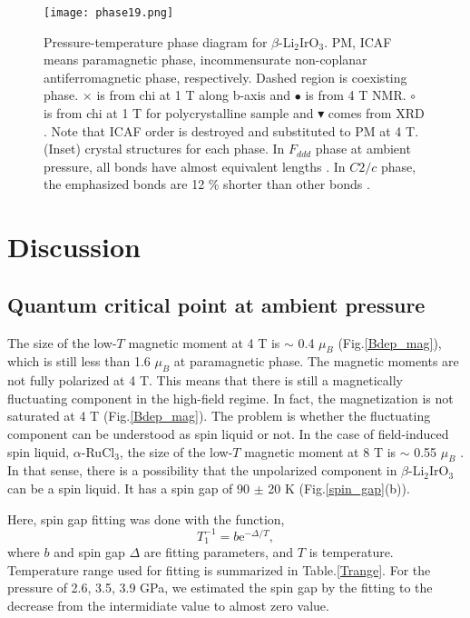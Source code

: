 \documentclass[a4,10.5pt]{report}
\begin{document}
\begin{figure}[h]
  \centering
  \texttt{[image: phase19.png]}
  \caption{Pressure-temperature phase diagram for $\beta$-Li$_2$IrO$_3$. 
  PM, ICAF means paramagnetic phase, incommensurate non-coplanar antiferromagnetic phase, respectively. 
  Dashed region is coexisting phase. 
  $\times$ is from chi at 1 T along b-axis and $\bullet$ is from 4 T NMR. 
  $\circ$ is from chi at 1 T for polycrystalline sample \cite{Majumder2018} and $\blacktriangledown$ comes from XRD \cite{veiga2017pressure}. 
  Note that ICAF order is destroyed and substituted to PM at 4 T. (Inset) crystal structures for each phase. 
  In $F_{ddd}$ phase at ambient pressure, all bonds have almost equivalent lengths \cite{takayama2015hyperhoneycomb}. 
  In $C2/c$ phase, the emphasized bonds are 12 \% shorter than other bonds \cite{veiga2017pressure}.}
  \label{phase}
\end{figure}

\chapter{Discussion}
\section{Quantum critical point at ambient pressure}
The size of the low-$T$ magnetic moment at 4 T is $\sim$ 0.4 $\mu_B$ (Fig.\ref{Bdep_mag}), which is still less than 1.6 $\mu_B$ at paramagnetic phase.
The magnetic moments are not fully polarized at 4 T.
This means that there is still a magnetically fluctuating component in the high-field regime.
In fact, the magnetization is not saturated at 4 T (Fig.\ref{Bdep_mag}).
The problem is whether the fluctuating component can be understood as spin liquid or not.
In the case of field-induced spin liquid, $\alpha$-RuCl$_3$, the size of the low-$T$ magnetic moment at 8 T is $\sim$ 0.55 $\mu_B$ \cite{Zheng2017}.
In that sense, there is a possibility that the unpolarized component in $\beta$-Li$_2$IrO$_3$ can be a spin liquid.
It has a spin gap of 90 $\pm$ 20 K (Fig.\ref{spin_gap}(b)).

Here, spin gap fitting was done with the function,
\begin{equation}
T^{-1}_1 = b\mathrm{e}^{-\Delta/T},
\end{equation}
where $b$ and spin gap $\Delta$ are fitting parameters, and $T$ is temperature.
Temperature range used for fitting is summarized in Table.\ref{Trange}.
For the pressure of 2.6, 3.5, 3.9 GPa, we estimated the spin gap by the fitting to the decrease from the intermidiate value to almost zero value.
\end{document}
